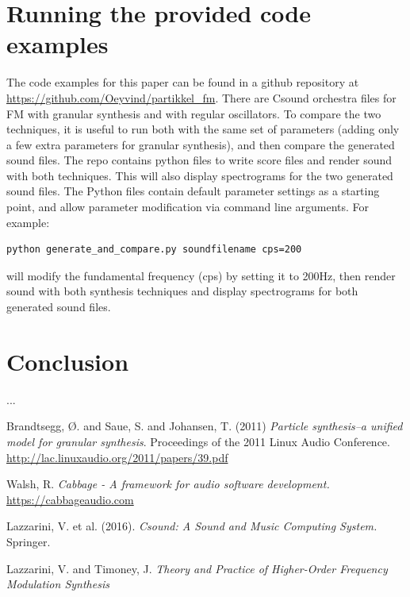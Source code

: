 \documentclass[runningheads,a4paper]{llncs}
\begin{document}
\section{Running the provided code examples}
The code examples for this paper can be found in a github repository at \url{https://github.com/Oeyvind/partikkel_fm}. There are Csound orchestra files for FM with granular synthesis and with regular oscillators. To compare the two techniques, it is useful to run both with the same set of parameters (adding only a few extra parameters for granular synthesis), and then compare the generated sound files. The repo contains python files to write score files and render sound with both techniques. This will also display spectrograms for the two generated sound files. The Python files contain default parameter settings as a starting point, and allow parameter modification via command line arguments. For example:
\begin{verbatim}
python generate_and_compare.py soundfilename cps=200
\end{verbatim}
will modify the fundamental frequency (cps) by setting it to 200Hz, then render sound with both synthesis techniques and display spectrograms for both generated sound files. 

\section{Conclusion}
...

\begin{thebibliography}{4}


 Brandtsegg, Ø. and Saue, S. and Johansen, T. (2011) \emph{Particle synthesis–a unified model for granular synthesis}. Proceedings of the 2011 Linux Audio Conference. \url{http://lac.linuxaudio.org/2011/papers/39.pdf}

 Walsh, R. \emph{Cabbage - A framework for audio software development.} \url{https://cabbageaudio.com}

 Lazzarini, V. et al. (2016). \emph{Csound: A Sound and Music Computing System.} Springer.

 Lazzarini, V. and Timoney, J. \emph{Theory and Practice of Higher-Order Frequency Modulation
Synthesis}


\end{thebibliography}
\end{document}
